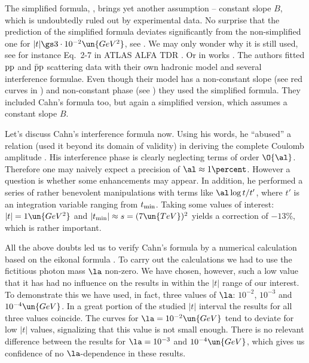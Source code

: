 The simplified \WaY{} formula, , brings yet another assumption -- constant slope $B$, which is undoubtedly ruled out by experimental data. No surprise that the prediction of the simplified formula deviates significantly from the non-simplified one for $|t| \gs 3\cdot 10^{-2}\un{GeV^2}$, see . We may only wonder why it is still used, see for instance Eq.~2-7 in ATLAS ALFA TDR .
Or in works . The authors fitted $\rm pp$ and $\rm\bar pp$ scattering data with their own hadronic model and several interference formulae. Even though their model has a non-constant slope (see red curves in ) and non-constant phase (see ) they used the simplified \WY{} formula. They included Cahn's formula too, but again a simplified version, which assumes a constant slope $B$.

Let's discuss Cahn's interference formula  now. Using his words, he ``abused'' a relation (used it beyond its domain of validity) in deriving the complete Coulomb amplitude . His interference phase is clearly neglecting terms of order $\O{\al}$. Therefore one may naively expect a precision of $\al\approx 1\percent$. However a question is whether some enhancements may appear. In addition, he performed a series of rather benevolent manipulations with terms like $\al \log t/ t'$, where $t'$ is an integration variable ranging from $t_{\rm min}$. Taking some values of interest: $|t| = 1\un{GeV^2}$ and $|t_{\rm min}| \approx s = (7\un{TeV})^2$ yields a correction of $-13\percent$, which is rather important.

All the above doubts led us to verify Cahn's formula by a numerical calculation based on the eikonal formula . To carry out the calculations we had to use the fictitious photon mass $\la$ non-zero. We have chosen, however, such a low value that it has had no influence on the results in within the $|t|$ range of our interest. To demonstrate this we have used, in fact, three values of $\la$: $10^{-2}$, $10^{-3}$ and $10^{-4}\un{GeV}$. In a great portion of the studied $|t|$ interval the results for all three values coincide. The curves for $\la = 10^{-2} \un{GeV}$ tend to deviate for low $|t|$ values, signalizing that this value is not small enough. There is no relevant difference between the results for $\la = 10^{-3}$ and $10^{-4}\un{GeV}$, which gives us confidence of no $\la$-dependence in these results.

